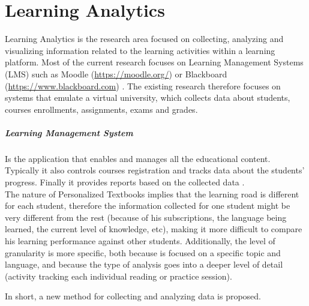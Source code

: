 \chapter{Learning Analytics}\label{ch:learning analytics}

Learning Analytics is the research area focused on collecting, analyzing and visualizing information \cite{Brown2011} related to the learning activities within a learning platform. Most of the current research focuses on Learning Management Systems (LMS) such as Moodle (\url{https://moodle.org/}) \cite{Park2015} \cite{Romero2008} or Blackboard (\url{https://www.blackboard.com}) \cite{Arnold2012}. The existing research therefore focuses on systems that emulate a virtual university, which collects data about students, courses enrollments, assignments, exams and grades.

\paragraph{Learning Management System}

Is the application that enables and manages all the educational content. Typically it also controls courses registration and tracks data about the students' progress. Finally it provides reports based on the collected data \cite{Watson2007}.\\


The nature of Personalized Textbooks implies that the learning road is different for each student, therefore the information collected for one student might be very different from the rest (because of his subscriptions, the language being learned, the current level of knowledge, etc), making it more difficult to compare his learning performance against other students. Additionally, the level of granularity is more specific, both because is focused on a specific topic and language, and because the type of analysis goes into a deeper level of detail (\ie activity tracking  each individual reading or practice session).

In short, a new method for collecting and analyzing data is proposed.


